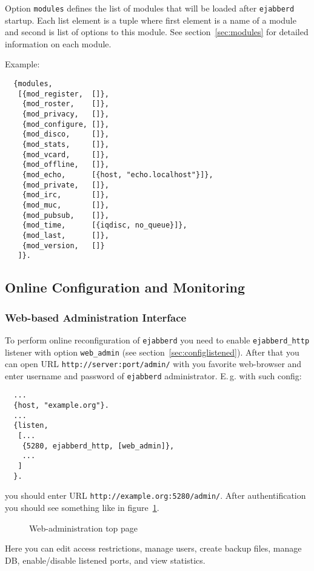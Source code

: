 \documentclass[a4paper,10pt]{article}
\newcommand{\imgscale}{0.58}
\newcommand{\insimg}[1]{\insscaleimg{\imgscale}{#1}}
\newcommand{\insscaleimg}[2]{
  \imgsrc{#2}{}
  \begin{latexonly}
    \scalebox{#1}{\texttt{[image: \#2]}}
  \end{latexonly}
}
\newcommand{\term}[1]{\texttt{#1}}
\newcommand{\ejabberd}{\texttt{ejabberd}}
\begin{document}
Option \term{modules} defines the list of modules that will be loaded after
\ejabberd{} startup.  Each list element is a tuple where first element is a
name of a module and second is list of options to this module.  See
section~\ref{sec:modules} for detailed information on each module.

Example:
\begin{verbatim}
  {modules,
   [{mod_register,  []},
    {mod_roster,    []},
    {mod_privacy,   []},
    {mod_configure, []},
    {mod_disco,     []},
    {mod_stats,     []},
    {mod_vcard,     []},
    {mod_offline,   []},
    {mod_echo,      [{host, "echo.localhost"}]},
    {mod_private,   []},
    {mod_irc,       []},
    {mod_muc,       []},
    {mod_pubsub,    []},
    {mod_time,      [{iqdisc, no_queue}]},
    {mod_last,      []},
    {mod_version,   []}
   ]}.
\end{verbatim}


\subsection{Online Configuration and Monitoring}
\label{sec:onlineconfig}

\subsubsection{Web-based Administration Interface}
\label{sec:webadm}

To perform online reconfiguration of \ejabberd{} you need to enable
\term{ejabberd\_http} listener with option \term{web\_admin} (see
section~\ref{sec:configlistened}).  After that you can open URL
\verb|http://server:port/admin/| with you favorite web-browser and enter
username and password of \ejabberd{} administrator.  E.\,g. with such config:
\begin{verbatim}
  ...
  {host, "example.org"}.
  ...
  {listen,
   [...
    {5280, ejabberd_http, [web_admin]},
    ...
   ]
  }.
\end{verbatim}
you should enter URL \verb|http://example.org:5280/admin/|.  After
authentification you should see something like in figure~\ref{fig:webadmmain}.
\begin{figure}[htbp]
  \centering
  \insimg{webadmmain.png}
  \caption{Web-administration top page}
  \label{fig:webadmmain}
\end{figure}
Here you can edit access restrictions, manage users, create backup files,
manage DB, enable/disable listened ports, and view statistics.
\end{document}
